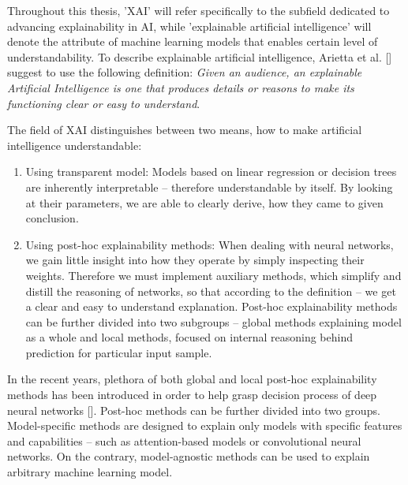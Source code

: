 
Throughout this thesis, 'XAI' will refer specifically to the subfield dedicated to advancing explainability in AI, while 'explainable artificial intelligence' will denote the attribute of machine learning models that enables certain level of understandability. To describe explainable artificial intelligence, Arietta et al. [] suggest to use the following definition: \emph{Given an audience, an explainable Artificial Intelligence is one that produces details or reasons to make its functioning clear or easy to understand}.\newline

\noindent
The field of XAI distinguishes between two means, how to make artificial intelligence understandable:

\begin{enumerate}
    \item Using transparent model: Models based on linear regression or decision trees are inherently interpretable -- therefore understandable by itself. By looking at their parameters, we are able to clearly derive, how they came to given conclusion.
    \item Using post-hoc explainability methods: When dealing with neural networks, we gain little insight into how they operate by simply inspecting their weights. Therefore we must implement auxiliary methods, which simplify and distill the reasoning of networks, so that according to the definition -- we get a clear and easy to understand explanation. Post-hoc explainability methods can be further divided into two subgroups -- global methods explaining model as a whole and local methods, focused on internal reasoning behind prediction for particular input sample.
\end{enumerate}

In the recent years, plethora of both global and local post-hoc explainability methods has been introduced in order to help grasp decision process of deep neural networks []. Post-hoc methods can be further divided into two groups. Model-specific methods are designed to explain only models with specific features and capabilities -- such as attention-based models or convolutional neural networks. On the contrary, model-agnostic methods can be used to explain arbitrary machine learning model.

